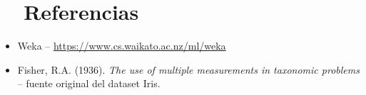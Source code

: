 \documentclass[11pt,a4paper]{article}
\begin{document}
\section{\faLink\ \ Referencias}
\begin{itemize}[leftmargin=1.6em, itemsep=4pt]
  \raggedright
  \item[\textcolor{cCyan}{\faLink}] Weka -- \url{https://www.cs.waikato.ac.nz/ml/weka}
  \item[\textcolor{cCyan}{\faLink}] Fisher, R.A. (1936). \textit{The use of multiple measurements in taxonomic problems} -- fuente original del dataset Iris.
\end{itemize}
\end{document}
